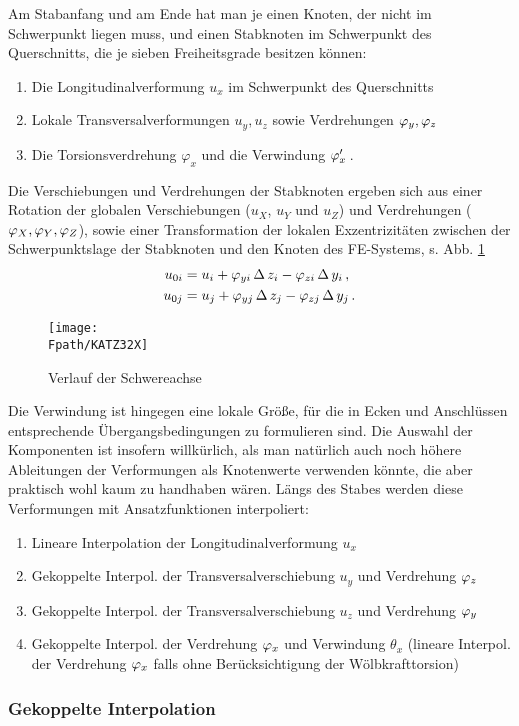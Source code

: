 Am Stabanfang und am Ende hat man je einen Knoten, der nicht im Schwerpunkt liegen muss, und einen Stabknoten im Schwerpunkt des Querschnitts, die je sieben Freiheitsgrade besitzen k\"{o}nnen:\\
\begin{enumerate}
\item  Die Longitudinalverformung $u_x$ im Schwerpunkt des Querschnitts
\item  Lokale Transversalverformungen  $u_y, u_z$ sowie Verdrehungen $\varphi_y, \varphi_z$
\item  Die Torsionsverdrehung $\varphi_x$ und die Verwindung $\varphi_x'$\,.
\end{enumerate}
Die Verschiebungen und Verdrehungen der Stabknoten ergeben sich aus einer Rotation der globalen Verschiebungen ($u_X$, $u_Y$ und $u_Z$) und Verdrehungen ($\varphi_X, \varphi_Y, \varphi_Z$), sowie einer Transformation der lokalen Exzentrizit\"{a}ten zwischen der Schwerpunktslage der Stabknoten und den Knoten des FE-Systems, s. Abb. \ref{Katz32}
\begin{align}
u_{0i} &= u_i + \varphi_{yi} \,\Delta\,z_i - \varphi_{zi}\,\Delta\,y_i \,,\\
u_{0j} &= u_j + \varphi_{yj} \,\Delta\,z_j - \varphi_{zj}\,\Delta\,y_j\,.
\end{align}
\begin{figure}[tbp] \centering
\if {} \sidecaption \fi
\texttt{[image: \\Fpath/KATZ32X]}
\caption{Verlauf der Schwereachse}
\label{Katz32}%
\end{figure}%
Die Verwindung ist hingegen eine lokale Gr\"{o}{\ss}e, f\"{u}r die in Ecken und Anschl\"{u}ssen entsprechende \"{U}bergangsbedingungen zu formulieren sind. Die Auswahl der Komponenten ist insofern willk\"{u}rlich, als man nat\"{u}rlich auch noch h\"{o}here Ableitungen der Verformungen als Knotenwerte verwenden k\"{o}nnte, die aber praktisch wohl kaum zu handhaben w\"{a}ren. L\"{a}ngs des Stabes werden diese Verformungen mit Ansatzfunktionen interpoliert:
\pagebreak
\begin{enumerate}
\item Lineare Interpolation der Longitudinalverformung $u_x$
\item Gekoppelte Interpol. der Transversalverschiebung $u_y$ und Verdrehung $\varphi_z$
\item  Gekoppelte Interpol. der Transversalverschiebung $u_z$ und Verdrehung
$\varphi_y$
\item  Gekoppelte Interpol. der Verdrehung
$\varphi_x$ und Verwindung $\theta_x$ (lineare Interpol. der Verdrehung $\varphi_x$ falls
ohne Ber\"{u}cksichtigung der W\"{o}lbkrafttorsion)
\end{enumerate}
\vspace{-0.5cm}
{\textcolor{sectionTitleBlue}{\subsubsection*{Gekoppelte Interpolation}}}


